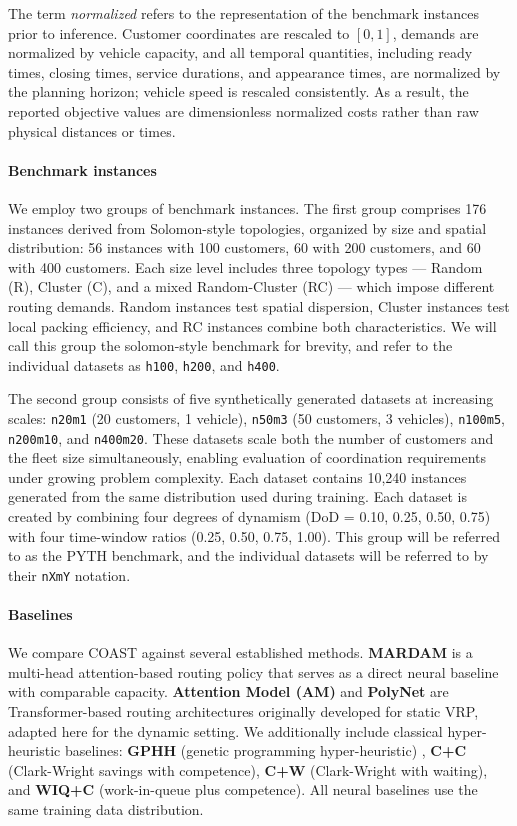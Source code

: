 \documentclass[letterpaper]{article}
\begin{document}
The term \emph{normalized} refers to the representation of the benchmark instances prior to inference. Customer coordinates are rescaled to $[0,1]$, demands are normalized by vehicle capacity, and all temporal quantities, including ready times, closing times, service durations, and appearance times, are normalized by the planning horizon; vehicle speed is rescaled consistently. As a result, the reported objective values are dimensionless normalized costs rather than raw physical distances or times.

\paragraph{Benchmark instances}
We employ two groups of benchmark instances. The first group comprises 176 instances derived from Solomon-style topologies, organized by size and spatial distribution: 56 instances with 100 customers, 60 with 200 customers, and 60 with 400 customers. Each size level includes three topology types --- Random (R), Cluster (C), and a mixed Random-Cluster (RC) --- which impose different routing demands. Random instances test spatial dispersion, Cluster instances test local packing efficiency, and RC instances combine both characteristics. We will call this group the solomon-style benchmark for brevity, and refer to the individual datasets as \texttt{h100}, \texttt{h200}, and \texttt{h400}.

The second group consists of five synthetically generated datasets at increasing scales: \texttt{n20m1} (20 customers, 1 vehicle), \texttt{n50m3} (50 customers, 3 vehicles), \texttt{n100m5}, \texttt{n200m10}, and \texttt{n400m20}. These datasets scale both the number of customers and the fleet size simultaneously, enabling evaluation of coordination requirements under growing problem complexity. Each dataset contains 10,240 instances generated from the same distribution used during training. Each dataset is created by combining four degrees of dynamism (DoD = 0.10, 0.25, 0.50, 0.75) with four time-window ratios (0.25, 0.50, 0.75, 1.00). This group will be referred to as the PYTH benchmark, and the individual datasets will be referred to by their \texttt{nXmY} notation.

\paragraph{Baselines}
We compare COAST against several established methods. \textbf{MARDAM} \cite{bono2021mardam} is a multi-head attention-based routing policy that serves as a direct neural baseline with comparable capacity. \textbf{Attention Model (AM)} \cite{kool2019attention} and \textbf{PolyNet} \cite{hottung2025polynet} are Transformer-based routing architectures originally developed for static VRP, adapted here for the dynamic setting. We additionally include classical hyper-heuristic baselines: \textbf{GPHH} (genetic programming hyper-heuristic) \cite{TAM2026114234}, \textbf{C+C} (Clark-Wright savings with competence), \textbf{C+W} (Clark-Wright with waiting), and \textbf{WIQ+C} (work-in-queue plus competence). All neural baselines use the same training data distribution.
\end{document}
